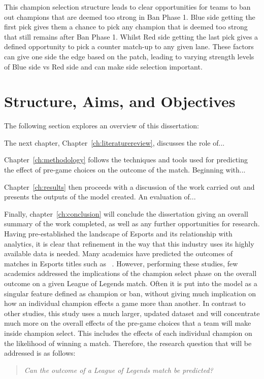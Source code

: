 This champion selection structure leads to clear opportunities for teams to ban out champions that are deemed too strong in Ban Phase 1.
Blue side getting the first pick gives them a chance to pick any champion that is deemed too strong that still remains after Ban Phase 1.
Whilst Red side getting the last pick gives a defined opportunity to pick a counter match-up to any given lane.
These factors can give one side the edge based on the \Gls{patch}, leading to varying strength levels of Blue side vs Red side and can make side selection important.

\section{Structure, Aims, and Objectives}\label{sec:Structure, Aims, and Objectives}

The following section explores an overview of this dissertation:

The next chapter, Chapter~\ref{ch:literaturereview}, discusses the role of...

Chapter~\ref{ch:methodology} follows the techniques and tools used for predicting the effect of pre-game choices on the outcome of the match.
Beginning with...


Chapter~\ref{ch:results} then proceeds with a discussion of the work
carried out and presents the outputs of the model created.
An evaluation of...

Finally, chapter~\ref{ch:conclusion} will conclude the dissertation giving an overall summary of the work completed, as well as any further opportunities for research. \\


Having pre-established the landscape of Esports and its relationship with analytics, it is clear that refinement in the way that this industry uses its highly available data is needed.
Many academics have predicted the outcomes of matches in Esports titles such as ~\citet{silva2018continuous}.
However, performing these studies, few academics addressed the implications of the champion select phase on the overall outcome on a given League of Legends match.
Often it is put into the model as a singular feature defined as champion or ban, without giving much implication on how an individual champion effects a game more than another.
In contrast to other studies, this study uses a much larger, updated dataset and will concentrate much more on the overall effects of the pre-game choices that a team will make inside champion select.
This includes the effects of each individual champion on the likelihood of winning a match.
Therefore, the research question that will be addressed is as follows:

\begin{quote}  \emph{Can the outcome of a League of Legends match be predicted?} \end{quote}
